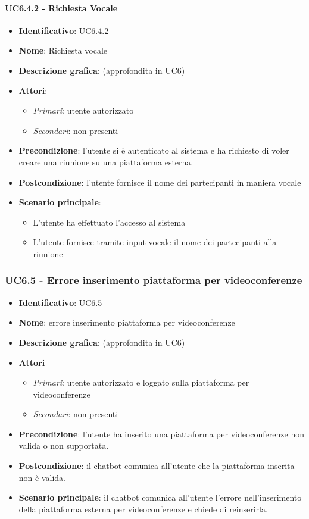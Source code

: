 \paragraph{UC6.4.2 - Richiesta Vocale}
\begin{itemize}
   \item \textbf{Identificativo}: UC6.4.2
   \item \textbf{Nome}: Richiesta vocale
   \item \textbf{Descrizione grafica}: (approfondita in UC6)
   \item \textbf{Attori}:
   \begin{itemize} 
       \item \textit{Primari}: utente autorizzato
       \item \textit{Secondari}: non presenti
   \end{itemize}
       \item \textbf{Precondizione}: l'utente si è autenticato al sistema e ha richiesto di voler creare una riunione su una piattaforma esterna.
       \item \textbf{Postcondizione}: l'utente fornisce il nome dei partecipanti in maniera vocale
    \item \textbf{Scenario principale}: 
       \begin{itemize}
           \item L'utente ha effettuato l'accesso al sistema 
           \item L'utente fornisce tramite input vocale il nome dei partecipanti alla riunione
       \end{itemize}
\end{itemize}

\subsubsection{UC6.5 - Errore inserimento piattaforma per videoconferenze}
\begin{itemize}
    \item \textbf{Identificativo}: UC6.5
    \item \textbf{Nome}: errore inserimento piattaforma per videoconferenze
    \item \textbf{Descrizione grafica}: (approfondita in UC6)
    \item \textbf{Attori}
 \begin{itemize} 
    \item \textit{Primari}: utente autorizzato e loggato sulla piattaforma per videoconferenze
    \item \textit{Secondari}: non presenti
 \end{itemize}
 \item \textbf{Precondizione}: l'utente ha inserito una piattaforma per videoconferenze non valida o non supportata.
 \item \textbf{Postcondizione}: il chatbot comunica all'utente che la piattaforma inserita non è valida.
 \item \textbf{Scenario principale}: il chatbot comunica all'utente l'errore nell'inserimento della piattaforma esterna per videoconferenze e chiede di reinserirla.
\end{itemize}
